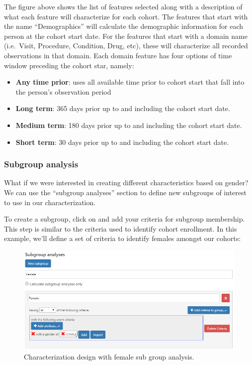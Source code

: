 \documentclass[11pt]{book}
\providecommand{\tightlist}{%
  \setlength{\itemsep}{0pt}\setlength{\parskip}{0pt}}
\theoremstyle{definition}
\theoremstyle{definition}
\theoremstyle{definition}
\theoremstyle{remark}
\begin{document}
The figure above shows the list of features selected along with a description of what each feature will characterize for each cohort. The features that start with the name ``Demographics'' will calculate the demographic information for each person at the cohort start date. For the features that start with a domain name (i.e.~Visit, Procedure, Condition, Drug, etc), these will characterize all recorded observations in that domain. Each domain feature has four options of time window preceding the cohort star, namely:

\begin{itemize}
\tightlist
\item
  \textbf{Any time prior}: uses all available time prior to cohort start that fall into the person's observation period
\item
  \textbf{Long term}: 365 days prior up to and including the cohort start date.
\item
  \textbf{Medium term}: 180 days prior up to and including the cohort start date.
\item
  \textbf{Short term}: 30 days prior up to and including the cohort start date.
\end{itemize}

\hypertarget{subgroup-analysis}{%
\subsubsection*{Subgroup analysis}\label{subgroup-analysis}}

What if we were interested in creating different characteristics based on gender? We can use the ``subgroup analyses'' section to define new subgroups of interest to use in our characterization.

To create a subgroup, click on and add your criteria for subgroup membership. This step is similar to the criteria used to identify cohort enrollment. In this example, we'll define a set of criteria to identify females amongst our cohorts:

\begin{figure}

{\centering \includegraphics[width=1\linewidth]{images/Characterization/atlasCharacterizationSubgroup} 

}

\caption{Characterization design with female sub group analysis.}\label{fig:atlasCharacterizationSubgroup}
\end{figure}
\end{document}
